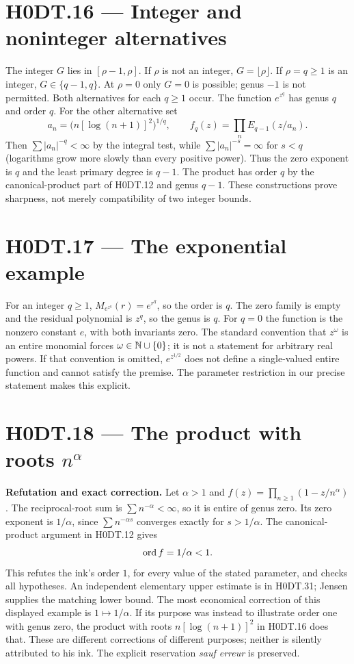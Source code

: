 \section*{H0DT.16 --- Integer and noninteger alternatives}
The integer $G$ lies in $[\rho-1,\rho]$. If $\rho$ is not an integer, $G=\lfloor\rho\rfloor$. If $\rho=q\ge1$ is an integer, $G\in\{q-1,q\}$. At $\rho=0$ only $G=0$ is possible; genus $-1$ is not permitted. Both alternatives for each $q\ge1$ occur. The function $e^{z^q}$ has genus $q$ and order $q$. For the other alternative set
\[
 a_n=\bigl(n[\log(n+1)]^2\bigr)^{1/q},\qquad
 f_q(z)=\prod_n E_{q-1}(z/a_n).
\]
Then $\sum|a_n|^{-q}<\infty$ by the integral test, while $\sum|a_n|^{-s}=\infty$ for $s<q$ (logarithms grow more slowly than every positive power). Thus the zero exponent is $q$ and the least primary degree is $q-1$. The product has order $q$ by the canonical-product part of H0DT.12 and genus $q-1$. These constructions prove sharpness, not merely compatibility of two integer bounds.

\section*{H0DT.17 --- The exponential example}
For an integer $q\ge1$, $M_{e^{z^q}}(r)=e^{r^q}$, so the order is $q$. The zero family is empty and the residual polynomial is $z^q$, so the genus is $q$. For $q=0$ the function is the nonzero constant $e$, with both invariants zero. The standard convention that $z^\omega$ is an entire monomial forces $\omega\in\mathbb N\cup\{0\}$; it is not a statement for arbitrary real powers. If that convention is omitted, $e^{z^{1/2}}$ does not define a single-valued entire function and cannot satisfy the premise. The parameter restriction in our precise statement makes this explicit.

\section*{H0DT.18 --- The product with roots $n^\alpha$}
\textbf{Refutation and exact correction.} Let $\alpha>1$ and $f(z)=\prod_{n\ge1}(1-z/n^\alpha)$. The reciprocal-root sum is $\sum n^{-\alpha}<\infty$, so it is entire of genus zero. Its zero exponent is $1/\alpha$, since $\sum n^{-\alpha s}$ converges exactly for $s>1/\alpha$. The canonical-product argument in H0DT.12 gives
\[
 \operatorname{ord} f=1/\alpha<1.
\]
This refutes the ink's order $1$, for every value of the stated parameter, and checks all hypotheses. An independent elementary upper estimate is in H0DT.31; Jensen supplies the matching lower bound. The most economical correction of this displayed example is $1\mapsto1/\alpha$. If its purpose was instead to illustrate order one with genus zero, the product with roots $n[\log(n+1)]^2$ in H0DT.16 does that. These are different corrections of different purposes; neither is silently attributed to his ink. The explicit reservation \emph{sauf erreur} is preserved.

